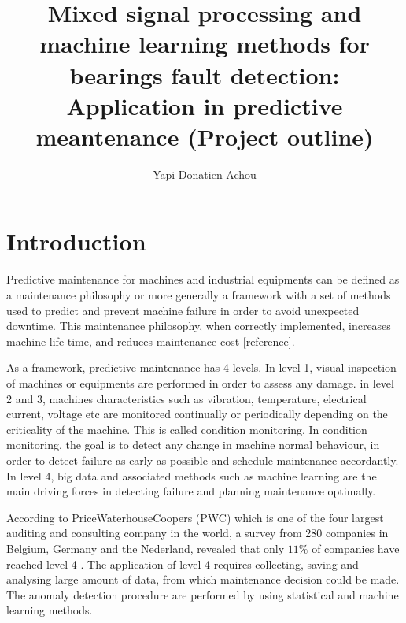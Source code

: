 \documentclass[11pt, oneside]{article}   	%
\title{Mixed signal processing and machine learning methods for bearings fault detection: Application in predictive meantenance (Project outline)}
\author{Yapi Donatien Achou}
\begin{document}
\maketitle
\tableofcontents
\newpage
\section{Introduction}
\begin{flushleft}
Predictive maintenance  for machines and industrial equipments can be defined as a maintenance philosophy or more generally a framework with a set of methods used to predict and prevent machine failure in order to avoid unexpected downtime. This maintenance philosophy, when correctly implemented, increases machine life time, and reduces maintenance cost [reference].
\end{flushleft}

\begin{flushleft}
As a framework, predictive maintenance has 4 levels. In level 1, visual inspection of machines or equipments are performed in order to assess any damage. in level 2 and 3, machines characteristics such as vibration, temperature, electrical current, voltage etc are monitored continually or periodically depending on the criticality of the machine. This is called condition monitoring. In condition monitoring, the goal is to detect any change in machine normal behaviour, in order to detect failure as early as possible and schedule maintenance accordantly. In level 4, big data and associated methods such as machine learning are the main driving forces in detecting failure and planning maintenance optimally. 
\end{flushleft}

\begin{flushleft}
According to PriceWaterhouseCoopers (PWC) which is one of the four largest auditing and consulting company in the world,  a survey from 280 companies in Belgium, Germany and the Nederland, revealed that only 
$11 \%$ of companies have reached level 4 \cite{pwc}. The application of level 4 requires collecting, saving and analysing large amount of data, from which maintenance decision could be made.
The anomaly detection procedure are performed by using statistical and machine learning methods.
\end{flushleft}
\end{document}
